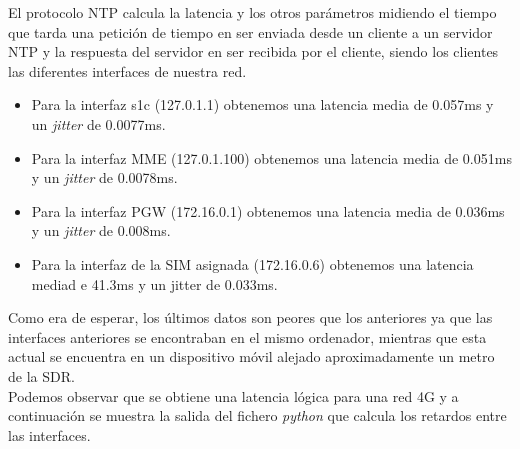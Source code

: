 El protocolo NTP calcula la latencia y los otros parámetros midiendo el tiempo que tarda una petición de tiempo en ser enviada desde un cliente a un servidor NTP y la respuesta del servidor en ser recibida por el cliente, siendo los clientes las diferentes interfaces de nuestra red.
\begin{itemize}
\item Para la interfaz s1c (127.0.1.1) obtenemos una latencia media de 0.057ms y un \textit{jitter} de 0.0077ms.
\item Para la interfaz MME (127.0.1.100) obtenemos una latencia media de 0.051ms y un \textit{jitter} de 0.0078ms.
\item Para la interfaz PGW (172.16.0.1) obtenemos una latencia media de 0.036ms y un \textit{jitter} de 0.008ms.
\item Para la interfaz de la SIM asignada (172.16.0.6) obtenemos una latencia mediad e 41.3ms y un jitter de 0.033ms. 
\end{itemize}
Como era de esperar, los últimos datos son peores que los anteriores ya que las interfaces anteriores se encontraban en el mismo ordenador, mientras que esta actual se encuentra en un dispositivo móvil alejado aproximadamente un metro de la SDR.\\


Podemos observar que se obtiene una latencia lógica para una red 4G y a continuación se muestra la salida del fichero \textit{python} que calcula los retardos entre las interfaces.

